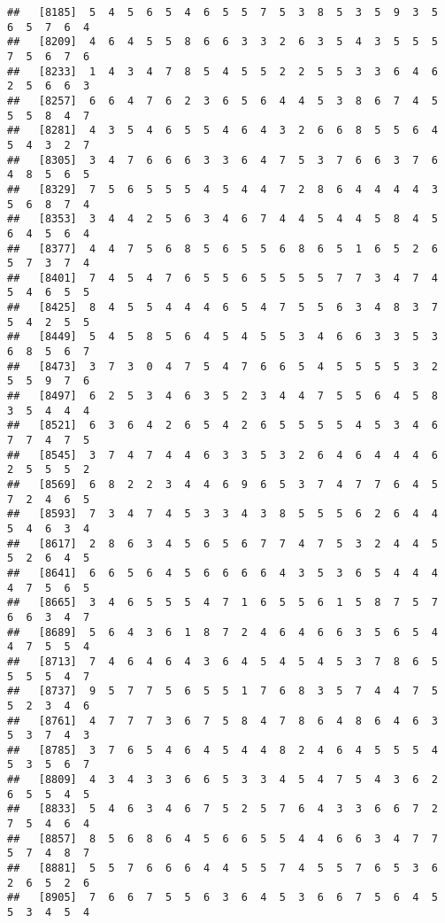 \documentclass[
]{book}
\begin{document}
\begin{verbatim}
##   [8185]  5  4  5  6  5  4  6  5  5  7  5  3  8  5  3  5  9  3  5  6  5  7  6  4
##   [8209]  4  6  4  5  5  8  6  6  3  3  2  6  3  5  4  3  5  5  5  7  5  6  7  6
##   [8233]  1  4  3  4  7  8  5  4  5  5  2  2  5  5  3  3  6  4  6  2  5  6  6  3
##   [8257]  6  6  4  7  6  2  3  6  5  6  4  4  5  3  8  6  7  4  5  5  5  8  4  7
##   [8281]  4  3  5  4  6  5  5  4  6  4  3  2  6  6  8  5  5  6  4  5  4  3  2  7
##   [8305]  3  4  7  6  6  6  3  3  6  4  7  5  3  7  6  6  3  7  6  4  8  5  6  5
##   [8329]  7  5  6  5  5  5  4  5  4  4  7  2  8  6  4  4  4  4  3  5  6  8  7  4
##   [8353]  3  4  4  2  5  6  3  4  6  7  4  4  5  4  4  5  8  4  5  6  4  5  6  4
##   [8377]  4  4  7  5  6  8  5  6  5  5  6  8  6  5  1  6  5  2  6  5  7  3  7  4
##   [8401]  7  4  5  4  7  6  5  5  6  5  5  5  5  7  7  3  4  7  4  5  4  6  5  5
##   [8425]  8  4  5  5  4  4  4  6  5  4  7  5  5  6  3  4  8  3  7  5  4  2  5  5
##   [8449]  5  4  5  8  5  6  4  5  4  5  5  3  4  6  6  3  3  5  3  6  8  5  6  7
##   [8473]  3  7  3  0  4  7  5  4  7  6  6  5  4  5  5  5  5  3  2  5  5  9  7  6
##   [8497]  6  2  5  3  4  6  3  5  2  3  4  4  7  5  5  6  4  5  8  3  5  4  4  4
##   [8521]  6  3  6  4  2  6  5  4  2  6  5  5  5  5  4  5  3  4  6  7  7  4  7  5
##   [8545]  3  7  4  7  4  4  6  3  3  5  3  2  6  4  6  4  4  4  6  2  5  5  5  2
##   [8569]  6  8  2  2  3  4  4  6  9  6  5  3  7  4  7  7  6  4  5  7  2  4  6  5
##   [8593]  7  3  4  7  4  5  3  3  4  3  8  5  5  5  6  2  6  4  4  5  4  6  3  4
##   [8617]  2  8  6  3  4  5  6  5  6  7  7  4  7  5  3  2  4  4  5  5  2  6  4  5
##   [8641]  6  6  5  6  4  5  6  6  6  6  4  3  5  3  6  5  4  4  4  4  7  5  6  5
##   [8665]  3  4  6  5  5  5  4  7  1  6  5  5  6  1  5  8  7  5  7  6  6  3  4  7
##   [8689]  5  6  4  3  6  1  8  7  2  4  6  4  6  6  3  5  6  5  4  4  7  5  5  4
##   [8713]  7  4  6  4  6  4  3  6  4  5  4  5  4  5  3  7  8  6  5  5  5  5  4  7
##   [8737]  9  5  7  7  5  6  5  5  1  7  6  8  3  5  7  4  4  7  5  5  2  3  4  6
##   [8761]  4  7  7  7  3  6  7  5  8  4  7  8  6  4  8  6  4  6  3  5  3  7  4  3
##   [8785]  3  7  6  5  4  6  4  5  4  4  8  2  4  6  4  5  5  5  4  5  3  5  6  7
##   [8809]  4  3  4  3  3  6  6  5  3  3  4  5  4  7  5  4  3  6  2  6  5  5  4  5
##   [8833]  5  4  6  3  4  6  7  5  2  5  7  6  4  3  3  6  6  7  2  7  5  4  6  4
##   [8857]  8  5  6  8  6  4  5  6  6  5  5  4  4  6  6  3  4  7  7  5  7  4  8  7
##   [8881]  5  5  7  6  6  6  4  4  5  5  7  4  5  5  7  6  5  3  6  2  6  5  2  6
##   [8905]  7  6  6  7  5  5  6  3  6  4  5  3  6  6  7  5  6  4  5  5  3  4  5  4

\end{verbatim}
\end{document}
